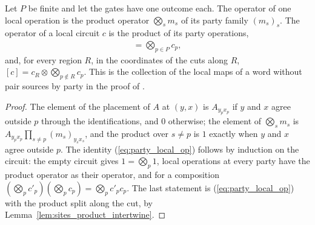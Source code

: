 \begin{theorem}
    \label{thm:party_local_op}
    \leanok
    Let $P$ be finite and let the gates have one outcome each. The operator of one
    local operation is the product operator $\bigotimes_sm_s$ of its party family
    $(m_s)_s$. The operator of a local circuit $c$ is the product of its party
    operations,
    \begin{align}
        [c]=\bigotimes_{p\in P}c_p,
        \label{eq:party_local_op}
    \end{align}
    and, for every region $R$, in the coordinates of the cuts along $R$,
    $[c]=c_R\otimes\bigotimes_{p\notin R}c_p$. This is the collection of the local
    maps of a word without pair sources by party in the proof of
    \cite[Theorem~5.2]{OpenAI2026PolynomialPEPS}.
\end{theorem}
\begin{proof}\leanok
    The element of the placement of $A$ at $(y,x)$ is $A_{y_px_p}$ if $y$ and $x$
    agree outside $p$ through the identifications, and $0$ otherwise; the element
    of $\bigotimes_sm_s$ is $A_{y_px_p}\prod_{s\neq p}(m_s)_{y_sx_s}$, and the product
    over $s\neq p$ is $1$ exactly when $y$ and $x$ agree outside $p$. The identity
    (\ref{eq:party_local_op}) follows by induction on the circuit: the empty circuit
    gives $1=\bigotimes_p1$, local operations at every party have the product
    operator as their operator, and for a composition
    $(\bigotimes_pc'_p)(\bigotimes_pc_p)=\bigotimes_pc'_pc_p$. The last statement is
    (\ref{eq:party_local_op}) with the product split along the cut, by
    Lemma~\ref{lem:sites_product_intertwine}.
\end{proof}

